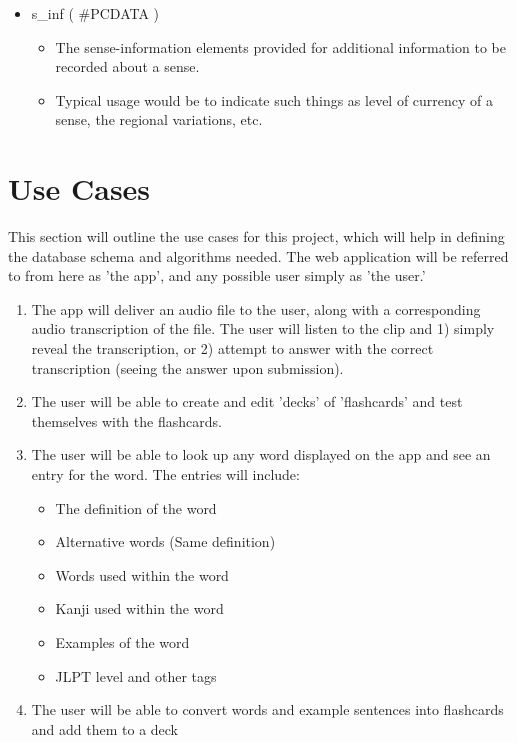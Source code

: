 \documentclass[11pt]{article}
\begin{document}
\begin{itemize}
\begin{itemize}
\end{itemize}
\item s\_inf ( \#PCDATA )
\begin{itemize}
\item The sense-information elements provided for additional information to be recorded about a sense.
\item Typical usage would be to indicate such things as level of currency of a sense, the regional variations, etc.
\end{itemize}
\end{itemize}

\section{Use Cases}
\label{sec-3}

This section will outline the use cases for this project, which will help in defining the database schema and algorithms needed. The web application
will be referred to from here as 'the app', and any possible user simply as 'the user.'

\begin{enumerate}
\item The app will deliver an audio file to the user, along with a corresponding audio transcription of the file. The user will listen to the clip and 1) simply reveal the transcription, or 2) attempt to answer with the correct transcription (seeing the answer upon submission).
\item The user will be able to create and edit 'decks' of 'flashcards' and test themselves with the flashcards.
\item The user will be able to look up any word displayed on the app and see an entry for the word. The entries will include:
\begin{itemize}
\item The definition of the word
\item Alternative words (Same definition)
\item Words used within the word
\item Kanji used within the word
\item Examples of the word
\item JLPT level and other tags
\end{itemize}
\item The user will be able to convert words and example sentences into flashcards and add them to a deck
\end{enumerate}
\end{document}
